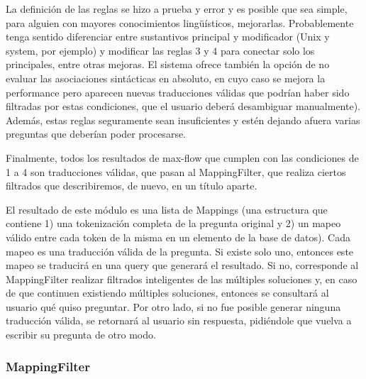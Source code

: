 La definición de las reglas se hizo a prueba y error y es posible que sea simple, para alguien con mayores conocimientos lingüísticos, mejorarlas. Probablemente tenga sentido diferenciar entre sustantivos principal y modificador (Unix y system, por ejemplo) y modificar las reglas 3 y 4 para conectar solo los principales, entre otras mejoras. El sistema ofrece también la opción de no evaluar las asociaciones sintácticas en absoluto, en cuyo caso se mejora la performance pero aparecen nuevas traducciones válidas que podrían haber sido filtradas por estas condiciones, que el usuario deberá desambiguar manualmente).
Además, estas reglas seguramente sean insuficientes y estén dejando afuera varias preguntas que deberían poder procesarse.

Finalmente, todos los resultados de max-flow que cumplen con las condiciones de 1 a  4 son traducciones válidas, que pasan al MappingFilter, que realiza ciertos filtrados que describiremos, de nuevo, en un título aparte.

El resultado de este módulo es una lista de Mappings (una estructura que contiene 1) una tokenización completa de la pregunta original y 2) un mapeo válido entre cada token de la misma en un elemento de la base de datos). Cada mapeo es una traducción válida de la pregunta. Si existe solo uno, entonces este mapeo se traducirá en una query que generará el resultado. Si no, corresponde al MappingFilter realizar filtrados inteligentes de las múltiples soluciones y, en caso de que continuen existiendo múltiples soluciones, entonces se consultará al usuario qué quiso preguntar. Por otro lado, si no fue posible generar ninguna traducción válida, se retornará al usuario sin respuesta, pidiéndole que vuelva a escribir su pregunta de otro modo.

\subsubsection*{MappingFilter}
\label{subsubsec:mapping-filter}

